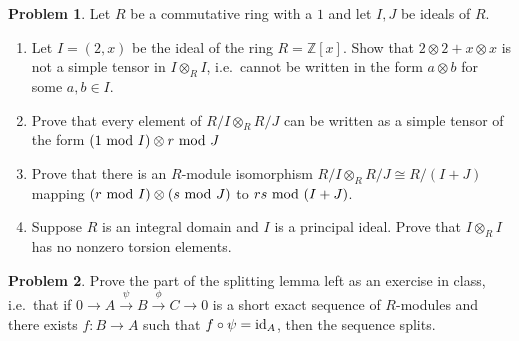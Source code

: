\documentclass[letterpaper,11pt]{amsart}
\theoremstyle{plain}
\theoremstyle{definition}
\newtheorem{pr}{Problem}
\theoremstyle{remark}
\begin{document}
\begin{pr}
    Let $R$ be a commutative ring with a $1$ and let $I,J$ be ideals of $R$.
    \begin{enumerate}
        \item Let $I = (2,x)$ be the ideal of the ring $R = \mathbb{Z}[x]$. Show that $2 \otimes 2 + x \otimes x$ is not a simple tensor in $I \otimes_R I$, i.e.~cannot be written in the form $a \otimes b$ for some $a,b \in I$.
        \item Prove that every element of $R/I \otimes_R R/J$ can be written as a simple tensor of the form $(1 \ {\rm mod} \ I) \otimes r \ {\rm mod} \ J$
        \item Prove that there is an $R$-module isomorphism $R/I \otimes_R R/J \cong R/(I+J)$ mapping $(r \ {\rm mod} \ I) \otimes (s \ {\rm mod} \ J)$ to $rs \ {\rm mod} \ (I+J)$.
        \item Suppose $R$ is an integral domain and $I$ is a principal ideal. Prove that $I \otimes_R I$ has no nonzero torsion elements.
    \end{enumerate}
\end{pr}

\begin{pr}
    Prove the part of the splitting lemma left as an exercise in class, i.e.~that if $0 \rightarrow A \overset{\psi}\rightarrow B \overset{\phi}\rightarrow C \rightarrow 0$ is a short exact sequence of $R$-modules and there exists $f: B \rightarrow A$ such that $f\circ \psi = {\rm id}_A$, then the sequence splits.
\end{pr}
\end{document}
